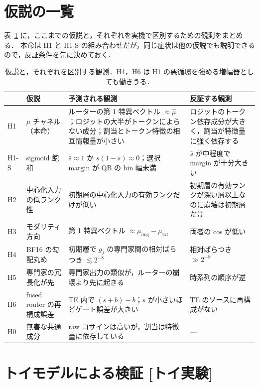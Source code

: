 \documentclass[a4paper,11pt]{ltjsarticle}
\theoremstyle{definition}
\theoremstyle{plain}
\newcommand{\Toy}{\textsf{\textcolor{cP}{[トイ実験]}}}
\begin{document}
\section{仮説の一覧}
表~\ref{tab:hyp} に，ここまでの仮説と，それぞれを実機で区別するための観測をまとめる．
本命は H1 と H1-S の組み合わせだが，同じ症状は他の仮説でも説明できるので，反証条件を先に決めておく．
\begin{table}[H]
\centering\footnotesize
\begin{tabularx}{\linewidth}{@{}l>{\raggedright}p{36mm}>{\raggedright}X>{\raggedright\arraybackslash}X@{}}
\toprule
& 仮説 & 予測される観測 & 反証する観測 \\ \midrule
H1 & $\mu$ チャネル（本命） & ルーターの第 1 特異ベクトル $\approx\hat\mu$；ロジットの大半がトークンによらない成分；割当とトークン特徴の相互情報量が小さい & ロジットのトークン依存成分が大きく，割当が特徴量に強く依存する \\
H1-S & sigmoid 飽和 & $\bar s\approx1$ か $s(1-s)\approx0$；選択 margin が QB の bin 幅未満 & $\bar s$ が中程度で margin が十分大きい \\
H2 & 中心化入力の低ランク性 & 初期層の中心化入力の有効ランクだけが低い & 初期層の有効ランクが深い層以上なのに崩壊は初期層だけ \\
H3 & モダリティ方向 & 第 1 特異ベクトル $\approx\mu_{\text{img}}-\mu_{\text{txt}}$ & 両者の cos が低い \\
H4 & BF16 の勾配丸め & 初期層で $g_j$ の専門家間の相対ばらつき $\lesssim2^{-8}$ & 相対ばらつき $\gg2^{-8}$ \\
H5 & 専門家の冗長化が先 & 専門家出力の類似が，ルーターの崩壊より先に起きる & 時系列の順序が逆 \\
H6 & fused router の再構成誤差 & TE 内で $(s+b)-b$；$s$ が小さいほどゲート誤差が大きい & TE のソースに再構成がない \\
H0 & 無害な共通成分 & raw コサインは高いが，割当は特徴量に依存している & --- \\
\bottomrule
\end{tabularx}
\caption{仮説と，それぞれを区別する観測．H4，H6 は H1 の悪循環を強める増幅器としても働きうる．}
\label{tab:hyp}
\end{table}

\section{トイモデルによる検証 \Toy}\label{sec:toy}
\end{document}
